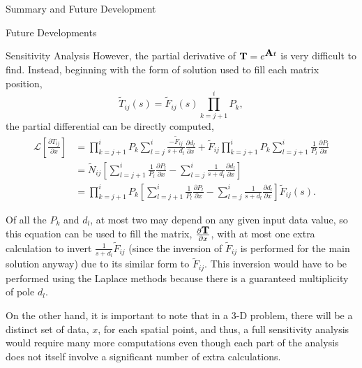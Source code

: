 \begin{chapter}{Summary and Future Development}
\begin{section}{Future Developments}
\begin{subsection}{Sensitivity Analysis}
      However, the partial derivative of $\mbox{$\mathbf{T}$} = e^{\mbox{$\mathbf{A}$}t}$ is
      very difficult to find.  Instead, beginning with the form of
      solution used to fill each matrix position,
      \begin{equation}
        \tilde{T}_{ij}(s) = \tilde{F}_{ij}(s) \prod_{k=j+1}^i P_k,
      \end{equation}
      the partial differential can be directly computed,
      \begin{equation}
        \begin{split}
          \mathcal{L}\left[ \frac{\partial T_{ij}}{\partial x} \right ]
          &= \prod_{k=j+1}^i P_k \sum_{l=j}^i
          \frac{-\tilde{F}_{ij}}{s+d_l}\frac{\partial d_l}{\partial x}
          + \tilde{F}_{ij} \prod_{k=j+1}^i P_k \sum_{l=j+1}^i \frac{1}{P_l}\frac{\partial P_l}{\partial x} \\
          &= \tilde{N}_{ij} \left [ \sum_{l=j+1}^i
            \frac{1}{P_l}\frac{\partial P_l}{\partial x}
            - \sum_{l=j}^i \frac{1}{s+d_l}\frac{\partial d_l}{\partial x} \right ] \\
          & = \prod_{k=j+1}^i P_k \left [ \sum_{l=j+1}^i
            \frac{1}{P_l}\frac{\partial P_l}{\partial x} - \sum_{l=j}^i
            \frac{1}{s+d_l}\frac{\partial d_l}{\partial x} \right ]
          \tilde{F}_{ij}(s).
        \end{split}
      \end{equation}
      
      Of all the $P_k$ and $d_l$, at most two may depend on any given
      input data value, so this equation can be used to fill the
      matrix, $\frac{\partial\mbox{$\mathbf{T}$}}{\partial x}$, with at most one
      extra calculation to invert $\frac{1}{s+d_l}\tilde{F}_{ij}$
      (since the inversion of $\tilde{F}_{ij}$ is performed for the
      main solution anyway) due to its similar form to
      $\tilde{F}_{ij}$.  This inversion would have to be performed
      using the Laplace methods because there is a guaranteed
      multiplicity of pole $d_l$.
      
      On the other hand, it is important to note that in a 3-D problem,
      there will be a distinct set of data, $x$, for each spatial point,
      and thus, a full sensitivity analysis would require many more
      computations even though each part of the analysis does not itself
      involve a significant number of extra calculations.
      
    \end{subsection}


\end{section}
\end{chapter}
